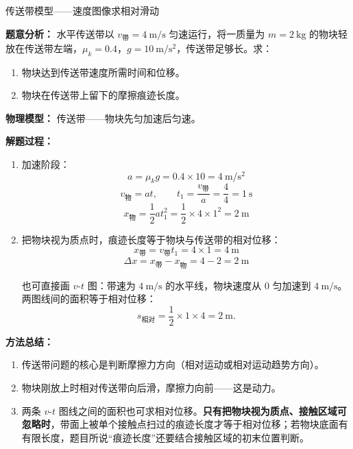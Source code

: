 \begin{examplebox}{传送带模型——速度图像求相对滑动}

\textbf{题意分析：} 水平传送带以 $v_{\text{带}} = 4\ \mathrm{m/s}$ 匀速运行，将一质量为 $m = 2\ \mathrm{kg}$ 的物块轻放在传送带左端，$\mu_k = 0.4$，$g = 10\ \mathrm{m/s^2}$，传送带足够长。求：
\begin{enumerate}
  \item 物块达到传送带速度所需时间和位移。
  \item 物块在传送带上留下的摩擦痕迹长度。
\end{enumerate}

\textbf{物理模型：} 传送带——物块先匀加速后匀速。

\begin{center}


\label{fig:example-conveyor-scratch}
\end{center}

\textbf{解题过程：}

\begin{enumerate}
  \item 加速阶段：
  \[
  a = \mu_k g = 0.4 \times 10 = 4\ \mathrm{m/s^2}
  \]
  \[
  v_{\text{物}} = a t,\qquad
  t_1 = \frac{v_{\text{带}}}{a} = \frac{4}{4} = 1\ \mathrm{s}
  \]
  \[
  x_{\text{物}} = \frac12 a t_1^2 = \frac12 \times 4 \times 1^2 = 2\ \mathrm{m}
  \]

  \item 把物块视为质点时，痕迹长度等于物块与传送带的相对位移：
  \[
  x_{\text{带}} = v_{\text{带}} t_1 = 4 \times 1 = 4\ \mathrm{m}
  \]
  \[
  \Delta x = x_{\text{带}} - x_{\text{物}} = 4 - 2 = 2\ \mathrm{m}
  \]

  也可直接画 $v$-$t$ 图：带速为 $4\ \mathrm{m/s}$ 的水平线，物块速度从 $0$ 匀加速到 $4\ \mathrm{m/s}$。两图线间的面积等于相对位移：
  \[
  s_{\text{相对}}=\frac12\times 1\times4=2\ \mathrm{m}.
  \]
  \begin{center}
  

  \label{fig:conveyor-vt-scratch}
  \end{center}
\end{enumerate}

\textbf{方法总结：}
\begin{enumerate}[itemsep=0.65em,topsep=0.4em,parsep=0pt]
  \item 传送带问题的核心是判断摩擦力方向（相对运动或相对运动趋势方向）。
  \item 物块刚放上时相对传送带向后滑，摩擦力向前——这是动力。
  \item 两条 $v$-$t$ 图线之间的面积也可求相对位移。\textbf{只有把物块视为质点、接触区域可忽略时}，带面上被单个接触点扫过的痕迹长度才等于相对位移；若物块底面有有限长度，题目所说“痕迹长度”还要结合接触区域的初末位置判断。
\end{enumerate}

\end{examplebox}


